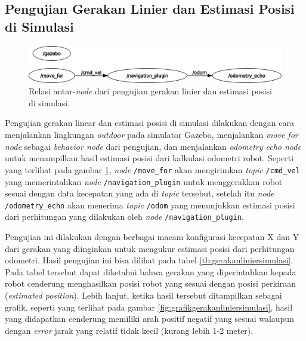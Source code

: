 \subsection{Pengujian Gerakan Linier dan Estimasi Posisi di Simulasi}
\label{subsec:liniersimulasi}

\begin{figure} [ht]
  \centering
  \includegraphics[scale=0.3]{gambar/rosgraph-navigation-plugin.png}
  \caption{Relasi antar-\emph{node} dari pengujian gerakan linier dan estimasi posisi di simulasi.}
  \label{fig:rosgraphnavigationplugin}
\end{figure}

Pengujian gerakan linear dan estimasi posisi di simulasi dilakukan dengan cara menjalankan lingkungan \emph{outdoor} pada simulator Gazebo,
  menjalankan \emph{move for node} sebagai \emph{behavior node} dari pengujian,
  dan menjalankan \emph{odometry echo node} untuk menampilkan hasil estimasi posisi dari kalkulasi odometri robot.
Seperti yang terlihat pada gambar \ref{fig:rosgraphnavigationplugin},
  \emph{node} \lstinline{/move_for} akan mengirimkan \emph{topic} \lstinline{/cmd_vel} yang memerintahkan \emph{node} \lstinline{/navigation_plugin} untuk menggerakkan robot sesuai dengan data kecepatan yang ada di \emph{topic} tersebut,
  setelah itu \emph{node} \lstinline{/odometry_echo} akan menerima \emph{topic} \lstinline{/odom} yang menunjukkan estimasi posisi dari perhitungan yang dilakukan oleh \emph{node} \lstinline{/navigation_plugin}.



Pengujian ini dilakukan dengan berbagai macam konfigurasi kecepatan X dan Y dari gerakan yang diinginkan untuk mengukur estimasi posisi dari perhitungan odometri.
Hasil pengujian ini bisa dilihat pada tabel \ref{tb:gerakanliniersimulasi}.
Pada tabel tersebut dapat diketahui bahwa gerakan yang diperintahkan kepada robot cenderung menghasilkan posisi robot yang sesuai dengan posisi perkiraan (\emph{estimated position}).
Lebih lanjut, ketika hasil tersebut ditampilkan sebagai grafik,
  seperti yang terlihat pada gambar \ref{fig:grafikgerakanliniersimulasi},
  hasil yang didapatkan cenderung memiliki arah positif negatif yang sesuai walaupun dengan \emph{error} jarak yang relatif tidak kecil (kurang lebih 1-2 meter).


